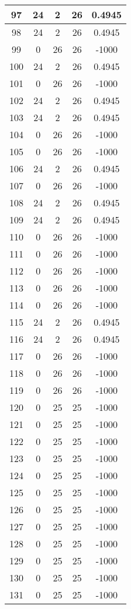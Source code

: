\documentclass[letterpaper, 12pt]{article}
\begin{document}
\begin{longtable}{|c|c|c|c|c|}
\hline
97 & 24 & 2 & 26 & 0.4945 \\
\hline
98 & 24 & 2 & 26 & 0.4945 \\
\hline
99 & 0 & 26 & 26 & -1000 \\
\hline
100 & 24 & 2 & 26 & 0.4945 \\
\hline
101 & 0 & 26 & 26 & -1000 \\
\hline
102 & 24 & 2 & 26 & 0.4945 \\
\hline
103 & 24 & 2 & 26 & 0.4945 \\
\hline
104 & 0 & 26 & 26 & -1000 \\
\hline
105 & 0 & 26 & 26 & -1000 \\
\hline
106 & 24 & 2 & 26 & 0.4945 \\
\hline
107 & 0 & 26 & 26 & -1000 \\
\hline
108 & 24 & 2 & 26 & 0.4945 \\
\hline
109 & 24 & 2 & 26 & 0.4945 \\
\hline
110 & 0 & 26 & 26 & -1000 \\
\hline
111 & 0 & 26 & 26 & -1000 \\
\hline
112 & 0 & 26 & 26 & -1000 \\
\hline
113 & 0 & 26 & 26 & -1000 \\
\hline
114 & 0 & 26 & 26 & -1000 \\
\hline
115 & 24 & 2 & 26 & 0.4945 \\
\hline
116 & 24 & 2 & 26 & 0.4945 \\
\hline
117 & 0 & 26 & 26 & -1000 \\
\hline
118 & 0 & 26 & 26 & -1000 \\
\hline
119 & 0 & 26 & 26 & -1000 \\
\hline
120 & 0 & 25 & 25 & -1000 \\
\hline
121 & 0 & 25 & 25 & -1000 \\
\hline
122 & 0 & 25 & 25 & -1000 \\
\hline
123 & 0 & 25 & 25 & -1000 \\
\hline
124 & 0 & 25 & 25 & -1000 \\
\hline
125 & 0 & 25 & 25 & -1000 \\
\hline
126 & 0 & 25 & 25 & -1000 \\
\hline
127 & 0 & 25 & 25 & -1000 \\
\hline
128 & 0 & 25 & 25 & -1000 \\
\hline
129 & 0 & 25 & 25 & -1000 \\
\hline
130 & 0 & 25 & 25 & -1000 \\
\hline
131 & 0 & 25 & 25 & -1000 \\

\end{longtable}
\end{document}
